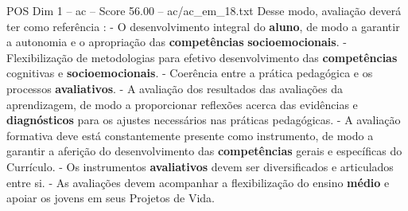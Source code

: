 \begin{textsample}{POS Dim 1 – ac – Score 56.00 – ac/ac\_em\_18.txt}
Desse modo, avaliação deverá ter como referência : - O desenvolvimento integral do \textbf{aluno}, de modo a garantir a autonomia e o apropriação das \textbf{competências} \textbf{socioemocionais}. - Flexibilização de metodologias para efetivo desenvolvimento das \textbf{competências} cognitivas e \textbf{socioemocionais}. - Coerência entre a prática pedagógica e os processos \textbf{avaliativos}. - A avaliação dos resultados das avaliações da aprendizagem, de modo a proporcionar reflexões acerca das evidências e \textbf{diagnósticos} para os ajustes necessários nas práticas pedagógicas. - A avaliação formativa deve está constantemente presente como instrumento, de modo a garantir a aferição do desenvolvimento das \textbf{competências} gerais e específicas do Currículo. - Os instrumentos \textbf{avaliativos} devem ser diversificados e articulados entre si. - As avaliações devem acompanhar a flexibilização do ensino \textbf{médio} e apoiar os jovens em seus Projetos de Vida.

\end{textsample}
